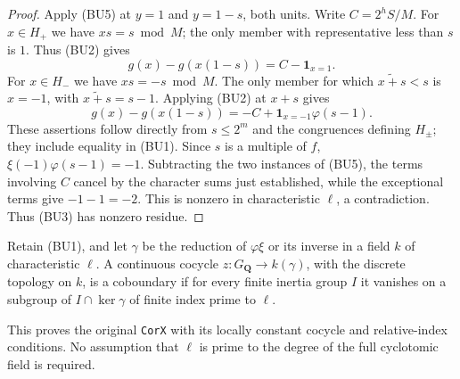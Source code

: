 \begin{proof}
Apply (BU5) at $y=1$ and $y=1-s$, both units. Write
$C=2^h S/M$. For $x\in H_+$ we have $xs=s\bmod M$;
the only member with representative less than $s$ is
$1$. Thus (BU2) gives
\[
             g(x)-g(x(1-s))=C-\mathbf 1_{x=1}.
\]
For $x\in H_-$ we have $xs=-s\bmod M$. The only member
for which $\widetilde{x+s}<s$ is $x=-1$, with
$\widetilde{x+s}=s-1$. Applying (BU2) at $x+s$ gives
\[
       g(x)-g(x(1-s))=-C+\mathbf 1_{x=-1}\varphi(s-1).
\]
These assertions follow directly from $s\le2^m$ and
the congruences defining $H_\pm$; they include equality
in (BU1). Since $s$ is a multiple of $f$,
$\xi(-1)\varphi(s-1)=-1$. Subtracting the two instances
of (BU5), the terms involving $C$ cancel by the character
sums just established, while the exceptional terms give
$-1-1=-2$. This is nonzero in characteristic $\ell$,
a contradiction. Thus (BU3) has nonzero residue.
\end{proof}

\begin{corollary}
\label{cor:selmer-dyadic-twist-cocycle}
Retain (BU1), and let $\gamma$ be the reduction of
$\varphi\xi$ or its inverse in a field $k$ of
characteristic $\ell$. A continuous cocycle
$z:G_{\mathbf Q}\to k(\gamma)$, with the discrete topology
on $k$, is a coboundary if for every finite inertia group
$I$ it vanishes on a subgroup of $I\cap\ker\gamma$
of finite index prime to $\ell$.

This proves the original \texttt{CorX} with its locally
constant cocycle and relative-index conditions.
No assumption that $\ell$ is prime to the degree of
the full cyclotomic field is required.
\end{corollary}


